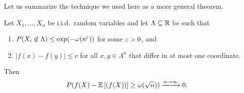 Let us summarize the technique we used here as a more general theorem.
\begin{theorem}
    Let $X_1, \dots, X_n$ be i.i.d.~random variables and let $\Lambda \subseteq \mathbb{R}$ be
    such that
    \begin{enumerate}
        \item $P(X_i \not\in \Lambda) \leq \exp(- \omega(n^\varepsilon))$ for some $\varepsilon > 0$, and
        \item $|f(x) - f(y)| \leq c$ for all $x,y \in \Lambda^n$ that differ in at most one coordinate.
    \end{enumerate}
    Then
    \begin{align*}
        P(f(X) - \mathbb{E}\left[(f(X))\right] \geq \omega(\sqrt{n})) \xrightarrow{n \rightarrow \infty} 0.
    \end{align*}
\end{theorem}